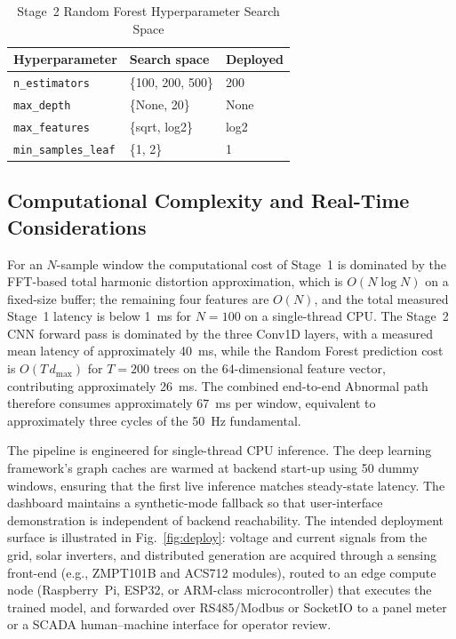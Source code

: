 \documentclass[conference]{IEEEtran}
\begin{document}
\begin{table}[!htbp]
  \centering
  \caption{Stage~2 Random Forest Hyperparameter Search Space}
  \label{tab:hp}
  \footnotesize
  \setlength{\tabcolsep}{6pt}
  \renewcommand{\arraystretch}{1.2}
  \begin{tabular}{|l|l|l|}
    \hline
    Hyperparameter & Search space & Deployed \\
    \hline
    \texttt{n\_estimators}      & \{100, 200, 500\} & 200    \\
    \hline
    \texttt{max\_depth}         & \{None, 20\}      & None   \\
    \hline
    \texttt{max\_features}      & \{sqrt, log2\}    & log2   \\
    \hline
    \texttt{min\_samples\_leaf} & \{1, 2\}          & 1      \\
    \hline
  \end{tabular}
\end{table}

\subsection{Computational Complexity and Real-Time Considerations}
For an $N$-sample window the computational cost of Stage~1 is
dominated by the FFT-based total harmonic distortion approximation,
which is $O(N\log N)$ on a fixed-size buffer; the remaining four
features are $O(N)$, and the total measured Stage~1 latency is below
1~ms for $N = 100$ on a single-thread CPU. The Stage~2 CNN forward
pass is dominated by the three Conv1D layers, with a measured mean
latency of approximately 40~ms, while the Random Forest prediction
cost is $O(T\,d_{\max})$ for $T = 200$ trees on the 64-dimensional
feature vector, contributing approximately 26~ms. The combined
end-to-end Abnormal path therefore consumes approximately 67~ms per
window, equivalent to approximately three cycles of the 50~Hz
fundamental.

The pipeline is engineered for single-thread CPU inference. The deep
learning framework's graph caches are warmed at backend start-up using
50 dummy windows, ensuring that the first live inference matches
steady-state latency. The dashboard maintains a synthetic-mode
fallback so that user-interface demonstration is independent of
backend reachability. The intended deployment surface is illustrated
in Fig.~\ref{fig:deploy}: voltage and current signals from the grid,
solar inverters, and distributed generation are acquired through a
sensing front-end (e.g., ZMPT101B and ACS712 modules), routed to an
edge compute node (Raspberry~Pi, ESP32, or ARM-class microcontroller)
that executes the trained model, and forwarded over RS485/Modbus or
SocketIO to a panel meter or a SCADA human--machine interface for
operator review.
\end{document}
